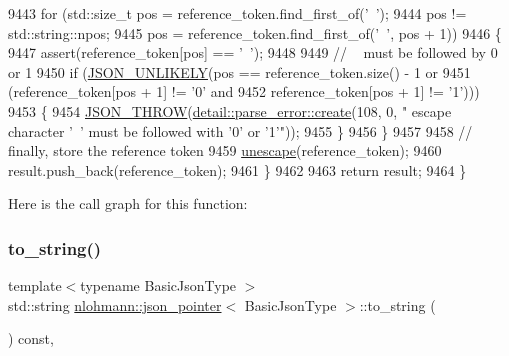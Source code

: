 \begin{DoxyCode}
9443             \textcolor{keywordflow}{for} (std::size\_t pos = reference\_token.find\_first\_of(\textcolor{charliteral}{'~'});
9444                     pos != std::string::npos;
9445                     pos = reference\_token.find\_first\_of(\textcolor{charliteral}{'~'}, pos + 1))
9446             \{
9447                 assert(reference\_token[pos] == \textcolor{charliteral}{'~'});
9448 
9449                 \textcolor{comment}{// ~ must be followed by 0 or 1}
9450                 \textcolor{keywordflow}{if} (\hyperlink{json_8hpp_ab77582407c64944e7db1ea95ab520253}{JSON\_UNLIKELY}(pos == reference\_token.size() - 1 or
9451                                   (reference\_token[pos + 1] != \textcolor{charliteral}{'0'} and
9452                                    reference\_token[pos + 1] != \textcolor{charliteral}{'1'})))
9453                 \{
9454                     \hyperlink{json_8hpp_a6c274f6db2e65c1b66c7d41b06ad690f}{JSON\_THROW}(\hyperlink{classnlohmann_1_1detail_1_1parse__error_a9fd60ad6bce80fd99686ad332faefd37}{detail::parse\_error::create}(108, 0, \textcolor{stringliteral}{"
      escape character '~' must be followed with '0' or '1'"}));
9455                 \}
9456             \}
9457 
9458             \textcolor{comment}{// finally, store the reference token}
9459             \hyperlink{classnlohmann_1_1json__pointer_ab85442d5fbcc289b79beeefc2175446f}{unescape}(reference\_token);
9460             result.push\_back(reference\_token);
9461         \}
9462 
9463         \textcolor{keywordflow}{return} result;
9464     \}
\end{DoxyCode}
Here is the call graph for this function\+:
\mbox{\label{classnlohmann_1_1json__pointer_ad7d3a3a215db8fe0964e644a918dcccb}} 
\subsubsection{\texorpdfstring{to\+\_\+string()}{to\_string()}}
{\footnotesize\ttfamily template$<$typename Basic\+Json\+Type $>$ \\
std\+::string \hyperlink{classnlohmann_1_1json__pointer}{nlohmann\+::json\+\_\+pointer}$<$ Basic\+Json\+Type $>$\+::to\+\_\+string (\begin{DoxyParamCaption}{ }\end{DoxyParamCaption}) const\hspace{0.3cm}{\ttfamily [inline]}, {\ttfamily [noexcept]}}



